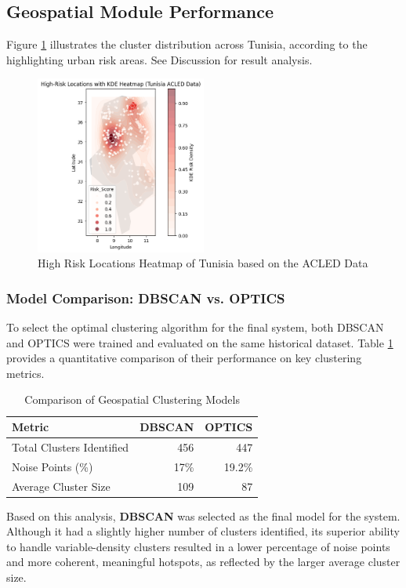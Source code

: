 \documentclass[12pt,a4paper,oneside,english]{book}
\begin{document}
{    \subsection{Geospatial Module Performance}
    \label{subsec:geo_results}

Figure \ref{fig:Clusters_heatmap} illustrates the cluster distribution across Tunisia, according to the highlighting urban risk areas. See Discussion for result analysis.
\begin{figure}[h!] %
    \centering
    \includegraphics[width=0.5\textwidth]{images/high_risk_locations_heatmap_tunisia_acled_data.png}
    \caption{High Risk Locations Heatmap of Tunisia based on the ACLED Data}
    \label{fig:Clusters_heatmap}
\end{figure}

    \subsubsection{Model Comparison: DBSCAN vs. OPTICS}
    \label{subsubsec:geo_model_comparison}
    To select the optimal clustering algorithm for the final system, both DBSCAN and OPTICS were trained and evaluated on the same historical dataset. Table \ref{tab:geo_model_comparison} provides a quantitative comparison of their performance on key clustering metrics.
    
    \begin{table}[h!]
        \centering
        \caption{Comparison of Geospatial Clustering Models}
        \label{tab:geo_model_comparison}
        \begin{tabular}{lrr}
            \hline
            \textbf{Metric} & \textbf{DBSCAN} & \textbf{OPTICS} \\ \hline
            Total Clusters Identified & 456 & 447 \\
            Noise Points (\%) & 17\% & 19.2\% \\
            Average Cluster Size & 109 & 87 \\
        \end{tabular}
    \end{table}
    Based on this analysis, \textbf{DBSCAN} was selected as the final model for the system. Although it had a slightly higher number of clusters identified, 
    its superior ability to handle 
    variable-density clusters resulted in a lower percentage of noise points and more coherent, meaningful hotspots, as reflected by the larger average cluster size.



}
\end{document}
